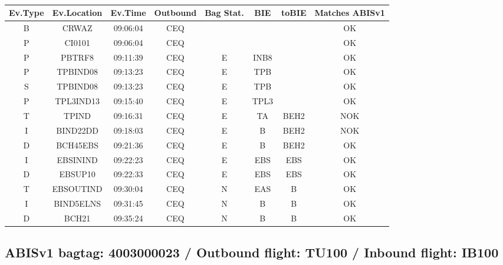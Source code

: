 \documentclass{report}
\begin{document}
\paragraph{}
\begin{longtable}{cccccccc}    \toprule
\rowcolor{white!50}
\textbf{Ev.Type} & \textbf{Ev.Location} & \textbf{Ev.Time} & \textbf{Outbound} & \textbf{Bag Stat.} & \textbf{BIE} & \textbf{toBIE} & \textbf{Matches ABISv1} \\\midrule
B & CRWAZ & 09:06:04  & CEQ &  &  &  & OK\\
P & CI0101 & 09:06:04  & CEQ &  &  &  & OK\\
P & PBTRF8 & 09:11:39  & CEQ & E & INB8 &  & OK\\
P & TPBIND08 & 09:13:23  & CEQ & E & TPB &  & OK\\
S & TPBIND08 & 09:13:23  & CEQ & E & TPB &  & OK\\
P & TPL3IND13 & 09:15:40  & CEQ & E & TPL3 &  & OK\\
T & TPIND & 09:16:31  & CEQ & E & TA & BEH2 & NOK\\
I & BIND22DD & 09:18:03  & CEQ & E & B & BEH2 & NOK\\
D & BCH45EBS & 09:21:36  & CEQ & E & B & BEH2 & OK\\
I & EBSININD & 09:22:23  & CEQ & E & EBS & EBS & OK\\
D & EBSUP10 & 09:22:33  & CEQ & E & EBS & EBS & OK\\
T & EBSOUTIND & 09:30:04  & CEQ & N & EAS & B & OK\\
I & BIND5ELNS & 09:31:45  & CEQ & N & B & B & OK\\
D & BCH21 & 09:35:24  & CEQ & N & B & B & OK\\
\bottomrule
\end{longtable}
\subsection*{ABISv1 bagtag: 4003000023 / Outbound flight: TU100 / Inbound flight: IB100}
\end{document}
